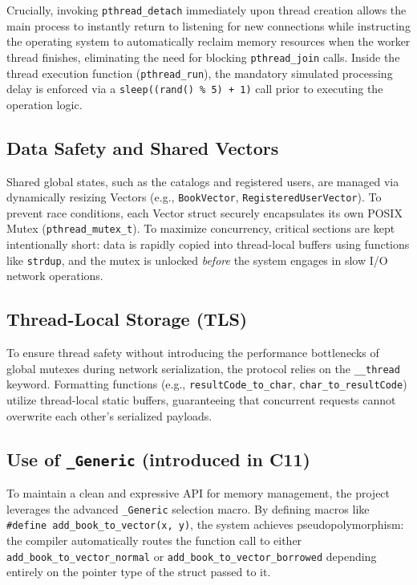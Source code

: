 \documentclass[11pt, a4paper]{article}
\begin{document}
Crucially, invoking \texttt{pthread\_detach} immediately upon thread creation allows the main process to instantly return to listening for new connections while instructing the operating system to automatically reclaim memory resources when the worker thread finishes, eliminating the need for blocking \texttt{pthread\_join} calls. Inside the thread execution function (\texttt{pthread\_run}), the mandatory simulated processing delay is enforced via a \texttt{sleep((rand() \% 5) + 1)} call prior to executing the operation logic.

\subsection{Data Safety and Shared Vectors}
Shared global states, such as the catalogs and registered users, are managed via dynamically resizing Vectors (e.g., \texttt{BookVector}, \texttt{RegisteredUserVector}). To prevent race conditions, each Vector struct securely encapsulates its own POSIX Mutex (\texttt{pthread\_mutex\_t}). To maximize concurrency, critical sections are kept intentionally short: data is rapidly copied into thread-local buffers using functions like \texttt{strdup}, and the mutex is unlocked \textit{before} the system engages in slow I/O network operations.

\subsection{Thread-Local Storage (TLS)}
To ensure thread safety without introducing the performance bottlenecks of global mutexes during network serialization, the protocol relies on the \texttt{\_\_thread} keyword. Formatting functions (e.g., \texttt{resultCode\_to\_char}, \texttt{char\_to\_resultCode}) utilize thread-local static buffers, guaranteeing that concurrent requests cannot overwrite each other's serialized payloads.

\subsection{Use of \texttt{\_Generic} (introduced in C11)}
To maintain a clean and expressive API for memory management, the project leverages the advanced \texttt{\_Generic} selection macro. By defining macros like \texttt{\#define add\_book\_to\_vector(x, y)}, the system achieves pseudopolymorphism: the compiler automatically routes the function call to either \texttt{add\_book\_to\_vector\_normal} or \texttt{add\_book\_to\_vector\_borrowed} depending entirely on the pointer type of the struct passed to it. 
\end{document}
